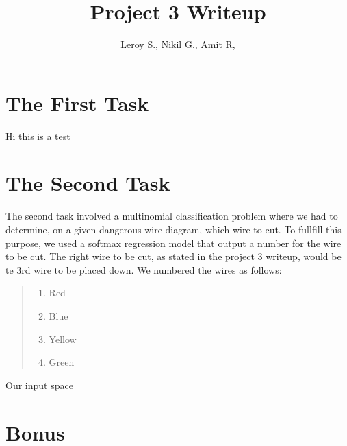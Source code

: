 \documentclass{article}
\title{Project 3 Writeup}
\author{Leroy S., Nikil G., Amit R,}
\begin{document}
\maketitle

\section*{The First Task}
Hi this is a test

\section*{The Second Task}
The second task involved a multinomial classification problem where we had to determine, on a given dangerous wire diagram, which wire to cut.
To fullfill this purpose, we used a softmax regression model that output a number for the wire to be cut. The right wire to be cut, as stated in the project 3 writeup, would be te 3rd wire to be placed down.\newline
\newline
We numbered the wires as follows:
\begin{quote}
    \begin{enumerate}
    \item Red
    \item Blue
    \item Yellow
    \item Green
    \end{enumerate}
    \end{quote}

Our input space 

\section*{Bonus}
\end{document}
